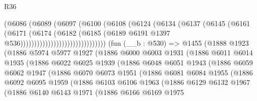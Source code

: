 \begin{lexlean}{R36}
\begin{coremodule}
                                    (@6086
                                      (@6089
                                        (@6097
                                          (@6100
                                            (@6108
                                              (@6124
                                                (@6134
                                                  (@6137
                                                    (@6145
                                                      (@6161
                                                        (@6171
                                                          (@6174
                                                            (@6182
                                                              (@6185
                                                                (@6189
                                                                  @6191
                                                                  @1397
                                                                  @536)))))))))))))))))))))))))))))))
    (fun (__b : @530) =>
    @1455
      (@1888
        @1923
        (@1886
          @5974
          @5977
          @1927
          (@1886
            @6000
            @6003
            @1931
            (@1886
              @6011
              @6014
              @1935
              (@1886
                @6022
                @6025
                @1939
                (@1886
                  @6048
                  @6051
                  @1943
                  (@1886
                    @6059
                    @6062
                    @1947
                    (@1886
                      @6070
                      @6073
                      @1951
                      (@1886
                        @6081
                        @6084
                        @1955
                        (@1886
                          @6092
                          @6095
                          @1959
                          (@1886
                            @6103
                            @6106
                            @1963
                            (@1886
                              @6129
                              @6132
                              @1967
                              (@1886
                                @6140
                                @6143
                                @1971
                                (@1886
                                  @6166
                                  @6169
                                  @1975

\end{coremodule}
\end{lexlean}
